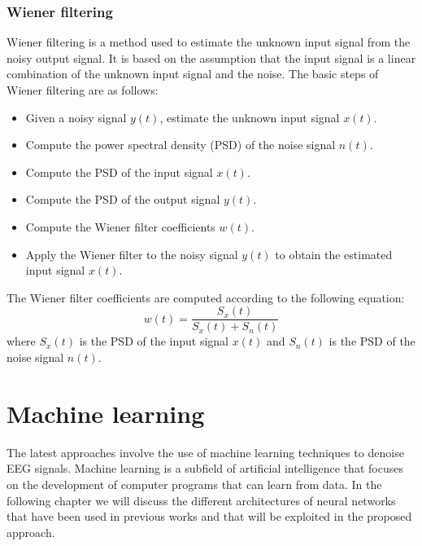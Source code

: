 \documentclass[a4paper, noexaminfo]{sapthesis}
\begin{document}
\subsubsection{Wiener filtering}
Wiener filtering\cite{wiener} is a method used to estimate the unknown
input signal from the noisy output signal. It is based on the assumption
that the input signal is a linear combination of the unknown input signal
and the noise. \newline
The basic steps of Wiener filtering are as follows:
\begin{itemize}
    \item Given a noisy signal $y(t)$, estimate the unknown input signal
    $x(t)$.
    \item Compute the power spectral density (PSD) of the noise signal
    $n(t)$.
    \item Compute the PSD of the input signal $x(t)$.
    \item Compute the PSD of the output signal $y(t)$.
    \item Compute the Wiener filter coefficients $w(t)$.
    \item Apply the Wiener filter to the noisy signal $y(t)$ to obtain the
    estimated input signal $x(t)$.
\end{itemize}
The Wiener filter coefficients are computed according to the following
equation:
\begin{equation}
\label{eq:wiener}
w(t) = \frac{S_x(t)}{S_x(t) + S_n(t)}
\end{equation}
where $S_x(t)$ is the PSD of the input signal $x(t)$ and $S_n(t)$ is the
PSD of the noise signal $n(t)$. \newline



\section{Machine learning}
The latest approaches involve the use of machine learning techniques
to denoise EEG signals. Machine learning is a subfield of artificial
intelligence that focuses on the development of computer programs that
can learn from data. In the following chapter we will discuss the
different architectures of neural networks that have been used in 
previous works and that will be exploited in the proposed approach.
\end{document}
